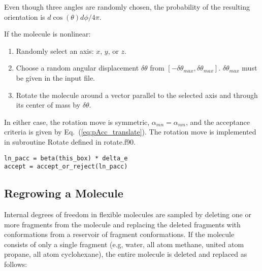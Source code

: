 Even though three angles are randomly chosen, the probability of the resulting orientation is $d\cos(\theta)d\phi/4\pi$.


If the molecule is nonlinear:

\begin{enumerate}
	\item Randomly select an axis: $x$, $y$, or $z$.
	\item Choose a random angular displacement $\delta \theta$ from $[-\delta \theta_{max}, \delta \theta_{max}]$. $\delta \theta_{max}$ must be given in the input file.
	\item Rotate the molecule around a vector parallel to the selected axis and through its center of mass by $\delta \theta$.
\end{enumerate}

In either case, the rotation move is symmetric, $\alpha_{mn} = \alpha_{nm}$, and the acceptance criteria is given by Eq.\ (\ref{eq:pAcc_translate}). The rotation move is implemented in subroutine Rotate defined in rotate.f90.

\begin{lstlisting}[firstnumber=261, caption=rotate.f90, label=code:rotate]
ln_pacc = beta(this_box) * delta_e
accept = accept_or_reject(ln_pacc)
\end{lstlisting}

\subsection{Regrowing a Molecule}
\label{sec:regrow}
Internal degrees of freedom in flexible molecules are sampled by deleting one or more fragments from the molecule and replacing the deleted fragments with conformations from a reservoir of fragment conformations. If the molecule consists of only a single fragment (e.g, water, all atom methane, united atom propane, all atom cyclohexane), the entire molecule is deleted and replaced as follows:


